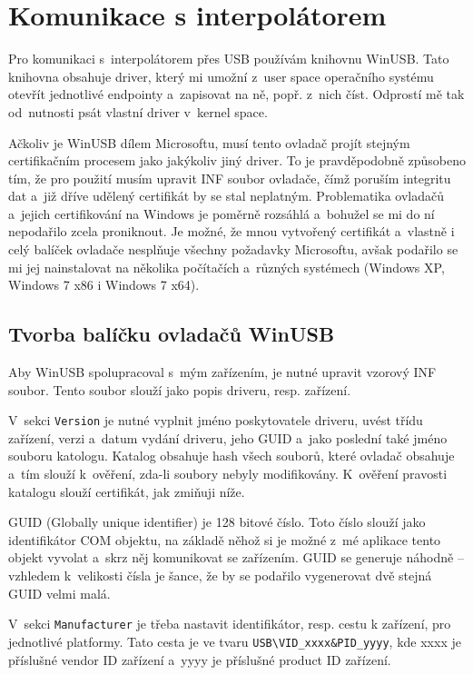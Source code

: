 	\section{Komunikace s interpolátorem}
	
	Pro komunikaci s~interpolátorem přes USB používám knihovnu WinUSB. Tato knihovna obsahuje driver, který mi umožní z~user space operačního systému otevřít jednotlivé endpointy a~zapisovat na ně, popř. z~nich číst. Odprostí mě tak od~nutnosti psát vlastní driver v~kernel space\cite{winusb}.
	
	Ačkoliv je WinUSB dílem Microsoftu, musí tento ovladač projít stejným certifikačním procesem jako jakýkoliv jiný driver. To je pravděpodobně způsobeno tím, že pro použití musím upravit INF soubor ovladače, čímž poruším integritu dat a~již dříve udělený certifikát by se stal neplatným. Problematika ovladačů a~jejich certifikování na Windows je poměrně rozsáhlá a~bohužel se mi do ní nepodařilo zcela proniknout. Je možné, že mnou vytvořený certifikát a~vlastně i celý balíček ovladače nesplňuje všechny požadavky Microsoftu, avšak podařilo se mi jej nainstalovat na několika počítačích a~různých systémech (Windows XP, Windows 7 x86 i Windows 7 x64).
	
		\subsection{Tvorba balíčku ovladačů WinUSB}
		Aby WinUSB spolupracoval s~mým zařízením, je nutné upravit vzorový INF soubor\cite{winusb}. Tento soubor slouží jako popis driveru, resp. zařízení.
		
		V~sekci {\tt Version} je nutné vyplnit jméno poskytovatele driveru, uvést třídu zařízení, verzi a~datum vydání driveru, jeho GUID a~jako poslední také jméno souboru katologu. Katalog obsahuje hash všech souborů, které ovladač obsahuje a~tím slouží k~ověření, zda-li soubory nebyly modifikovány. K~ověření pravosti katalogu slouží certifikát, jak zmiňuji níže.
		
		GUID (Globally unique identifier) je 128 bitové číslo\cite{wiki:guid}. Toto číslo slouží jako identifikátor COM objektu, na základě něhož si je možné z~mé aplikace tento objekt vyvolat a~skrz něj komunikovat se zařízením. GUID se generuje náhodně -- vzhledem k~velikosti čísla je šance, že by se podařilo vygenerovat dvě stejná GUID velmi malá\cite{winusb}.
		
		V~sekci {\tt Manufacturer} je třeba nastavit identifikátor, resp. cestu k zařízení, pro jednotlivé platformy. Tato cesta je ve tvaru {\tt USB\textbackslash VID\_xxxx\&PID\_yyyy}, kde xxxx je příslušné vendor ID zařízení a~yyyy je příslušné product ID zařízení.
		
